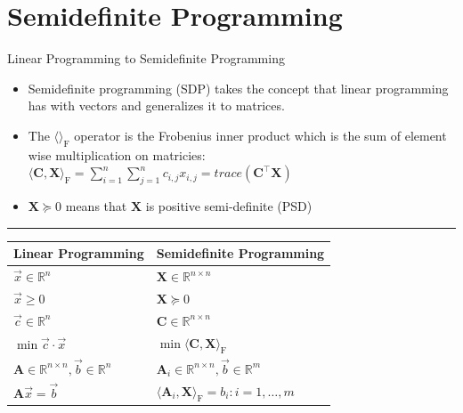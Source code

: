 \documentclass[
	11pt, %
]{beamer}
\begin{document}
\section{Semidefinite Programming}
\begin{frame}[label={sec:org73100b6}]{Linear Programming to Semidefinite Programming}
\begin{itemize}
\item Semidefinite programming (SDP) takes the concept that linear programming has
with vectors and generalizes it to matrices.
\end{itemize}

\begin{itemize}
\item The \( \langle \rangle_{\mathrm{F}} \) operator is the Frobenius inner product which is the sum of element wise multiplication on matricies:
\( \langle \mathbf{C},  \mathbf{X} \rangle_{\mathrm{F}} = \sum_{i = 1}^n \sum_{j = 1}^n c_{i, j} x_{i, j} = trace(\mathbf{C}^\top \mathbf{X}) \)
\item \( \mathbf{X} \succeq 0 \) means that \( \mathbf{X} \) is positive semi-definite (PSD)
\end{itemize}
\noindent\rule{\textwidth}{0.5pt}
\begin{center}
\begin{tabular}{ll}
Linear Programming & Semidefinite Programming\\[0pt]
\hline
\(\vec{x} \in \mathbb{R}^n\) & \(\mathbf{X} \in \mathbb{R}^{n \times n}\)\\[0pt]
\(\vec{x} \geq 0\) & \(\mathbf{X} \succeq 0\)\\[0pt]
\(\vec{c} \in \mathbb{R}^n\) & \(\mathbf{C} \in \mathbb{R}^{n \times n}\)\\[0pt]
\(\min \vec{c} \cdot \vec{x}\) & \(\min \langle \mathbf{C}, \mathbf{X}\rangle_{\mathrm{F}} \)\\[0pt]
\(\mathbf{A} \in \mathbb{R}^{n \times n}, \vec{b} \in \mathbb{R}^n\) & \(\mathbf{A}_{i} \in \mathbb{R}^{n \times n}, \vec{b} \in \mathbb{R}^m\)\\[0pt]
\(\mathbf{A} \vec{x} = \vec{b}\) & \(\langle \mathbf{A}_i, \mathbf{X}\rangle_{\mathrm{F}} = b_i : i = 1, \ldots, m\)\\[0pt]
\end{tabular}
\end{center}
\end{frame}
\end{document}
